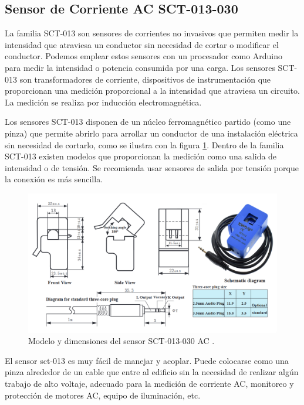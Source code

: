 \subsection{Sensor de Corriente AC SCT-013-030}

La familia SCT-013 son sensores de corrientes no invasivos que permiten medir la intensidad que atraviesa un conductor sin necesidad de cortar o modificar el conductor. Podemos emplear estos sensores con un procesador como Arduino para medir la intensidad o potencia consumida por una carga. Los sensores SCT-013 son transformadores de corriente, dispositivos de instrumentación que proporcionan una medición proporcional a la intensidad que atraviesa un circuito. La medición se realiza por inducción electromagnética. 

Los sensores SCT-013 disponen de un núcleo ferromagnético partido (como une pinza) que permite abrirlo para arrollar un conductor de una instalación eléctrica sin necesidad de cortarlo, como se ilustra con la figura \ref{fig:sensorCorriente}. Dentro de la familia SCT-013 existen modelos que proporcionan la medición como una salida de intensidad o de tensión. Se recomienda usar sensores de salida por tensión porque la conexión es más sencilla. 

\begin{figure}[htbp]
	\centering
	\includegraphics[width=1.0\textwidth]{./Figures/sensorCorriente2.png}
	\caption{Modelo y dimensiones del sensor SCT-013-030 AC \protect\footnotemark.}

	\label{fig:sensorCorriente}
\end{figure}


El sensor sct-013 es muy fácil de manejar y acoplar. Puede colocarse como una pinza alrededor de un cable que entre al edificio sin la necesidad de realizar algún trabajo de alto voltaje, adecuado para la medición de corriente AC, monitoreo y protección de motores AC, equipo de iluminación, etc.

